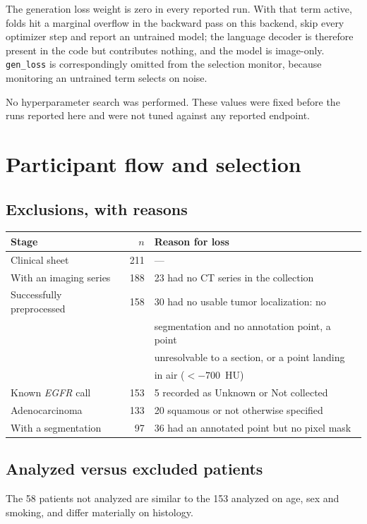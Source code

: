 \documentclass[11pt]{article}
\begin{document}
The generation loss weight is zero in every reported run. With that term active,
folds hit a marginal overflow in the backward pass on this backend, skip every
optimizer step and report an untrained model; the language decoder is therefore
present in the code but contributes nothing, and the model is image-only.
\texttt{gen\_loss} is correspondingly omitted from the selection monitor, because
monitoring an untrained term selects on noise.

No hyperparameter search was performed. These values were fixed before the runs
reported here and were not tuned against any reported endpoint.

\section{Participant flow and selection}

\subsection{Exclusions, with reasons}

\begin{tabular}{lrl}
\toprule
Stage & $n$ & Reason for loss \\
\midrule
Clinical sheet & 211 & --- \\
With an imaging series & 188 & 23 had no CT series in the collection \\
Successfully preprocessed & 158 & 30 had no usable tumor localization: no \\
 & & segmentation and no annotation point, a point \\
 & & unresolvable to a section, or a point landing \\
 & & in air ($<-700$~HU) \\
Known \textit{EGFR} call & 153 & 5 recorded as Unknown or Not collected \\
Adenocarcinoma & 133 & 20 squamous or not otherwise specified \\
With a segmentation & 97 & 36 had an annotated point but no pixel mask \\
\bottomrule
\end{tabular}

\subsection{Analyzed versus excluded patients}

The 58 patients not analyzed are similar to the 153 analyzed on age, sex and
smoking, and differ materially on histology.
\end{document}
